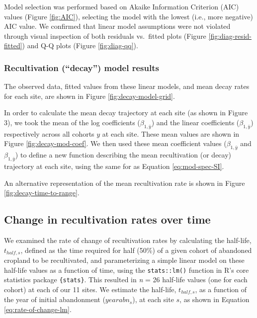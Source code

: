 \documentclass[
]{article}
\begin{document}
Model selection was performed based on Akaike Information Criterion (AIC) values (Figure \ref{fig:AIC}), selecting the model with the lowest (i.e., more negative) AIC value.
We confirmed that linear model assumptions were not violated through visual inspection of both residuals vs.~fitted plots (Figure \ref{fig:diag-resid-fitted}) and Q-Q plots (Figure \ref{fig:diag-qq}).

\hypertarget{recultivation-decay-model-results}{%
\subsubsection{Recultivation (``decay'') model results}\label{recultivation-decay-model-results}}

The observed data, fitted values from these linear models, and mean decay rates for each site, are shown in Figure \ref{fig:decay-model-grid}.

In order to calculate the mean decay trajectory at each site (as shown in Figure 3), we took the mean of the log coefficients (\(\beta_{1, \bar{y}}\)) and the linear coefficients (\(\beta_{1, \bar{y}}\)) respectively across all cohorts \(y\) at each site.
These mean values are shown in Figure \ref{fig:decay-mod-coef}.
We then used these mean coefficient values (\(\beta_{1, \bar{y}}\) and \(\beta_{1, \bar{y}}\)) to define a new function describing the mean recultivation (or decay) trajectory at each site, using the same for as Equation \eqref{eq:mod-spec-SI}.

An alternative representation of the mean recultivation rate is shown in Figure \ref{fig:decay-time-to-range}.

\hypertarget{section-methods-rate-of-change}{%
\subsection{Change in recultivation rates over time}\label{section-methods-rate-of-change}}

We examined the rate of change of recultivation rates by calculating the half-life, \(t_{half,s}\), defined as the time required for half (50\%) of a given cohort of abandoned cropland to be recultivated, and parameterizing a simple linear model on these half-life values as a function of time, using the \texttt{stats::lm()} function in R's core statistics package \texttt{\{stats\}}.
This resulted in \emph{n} = 26 half-life values (one for each cohort) at each of our 11 sites.
We estimate the half-life, \(t_{half,s}\), as a function of the year of initial abandonment (\(yearabn_{s}\)), at each site \(s\), as shown in Equation \eqref{eq:rate-of-change-lm}.
\end{document}
